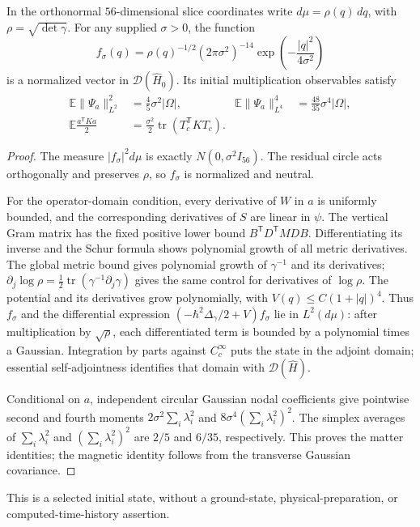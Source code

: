 \begin{proposition}
\label{prop:whitney-interacting-gaussian-state}
In the orthonormal \(56\)-dimensional slice coordinates write
\(d\mu=\rho(q)\,dq\), with \(\rho=\sqrt{\det\gamma}\).
For any supplied \(\sigma>0\), the function
\begin{equation}
 f_\sigma(q)=\rho(q)^{-1/2}(2\pi\sigma^2)^{-14}
                    \exp\!\left(-\frac{|q|^2}{4\sigma^2}\right)
 \label{eq:whitney-interacting-gaussian-state}
\end{equation}
is a normalized vector in \(\mathcal D(\widehat H_0)\). Its initial
multiplication observables satisfy
\begin{align}
 \mathbb E\|\Psi_a\|_{L^2}^2&=\frac45\sigma^2|\Omega|,&
 \mathbb E\|\Psi_a\|_{L^4}^4&=\frac{48}{35}\sigma^4|\Omega|,
 \label{eq:whitney-interacting-gaussian-matter-moments}\\
 \mathbb E\frac{a^{\mathsf T}Ka}{2}
       &=\frac{\sigma^2}{2}\operatorname{tr}(T_c^{\mathsf T}KT_c).
 \label{eq:whitney-interacting-gaussian-magnetic-moment}
\end{align}
\end{proposition}
\begin{proof}
The measure \(|f_\sigma|^2d\mu\) is exactly
\(N(0,\sigma^2I_{56})\). The residual circle acts orthogonally and
preserves \(\rho\), so \(f_\sigma\) is normalized and neutral.

For the operator-domain condition, every derivative of \(W\) in \(a\)
is uniformly bounded, and the corresponding derivatives of \(S\) are
linear in \(\psi\). The vertical Gram matrix has the fixed positive
lower bound \(B^{\mathsf T}D^{\mathsf T}MDB\). Differentiating its inverse
and the Schur formula shows polynomial growth of all metric derivatives.
The global metric bound gives polynomial growth of \(\gamma^{-1}\)
and its derivatives; \(\partial_j\log\rho=
\tfrac12\operatorname{tr}(\gamma^{-1}\partial_j\gamma)\) gives the same
control for derivatives of \(\log\rho\). The potential and its
derivatives grow polynomially, with \(V(q)\leq C(1+|q|)^4\).
Thus \(f_\sigma\) and the differential expression
\((-\hbar^2\Delta_\gamma/2+V)f_\sigma\) lie in \(L^2(d\mu)\):
after multiplication by \(\sqrt\rho\), each differentiated term is
bounded by a polynomial times a Gaussian. Integration by parts against
\(C_c^\infty\) puts the state in the adjoint domain; essential
self-adjointness identifies that domain with \(\mathcal D(\widehat H)\).

Conditional on \(a\), independent circular Gaussian nodal coefficients
give pointwise second and fourth moments
\(2\sigma^2\sum_i\lambda_i^2\) and
\(8\sigma^4(\sum_i\lambda_i^2)^2\). The simplex averages of
\(\sum_i\lambda_i^2\) and \((\sum_i\lambda_i^2)^2\) are
\(2/5\) and \(6/35\), respectively. This proves the matter identities;
the magnetic identity follows from the transverse Gaussian covariance.
\end{proof}
This is a selected initial state, without a ground-state,
physical-preparation, or computed-time-history assertion.

